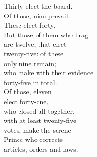\begin{paracol}{2}
	\begin{leftcolumn}
		\centering
		\textit{}
	\end{leftcolumn}
	
	\begin{rightcolumn}
		\centering
			Thirty elect the board. \\ 
			Of those, nine prevail. \\
			These elect forty.\\
			But those of them who brag \\
			are twelve, that elect \\
			twenty-five: of these \\
			only nine remain; \\
			who make with their evidence \\
			forty-five in total. \\
			Of those, eleven \\
			elect forty-one, \\
			who closed all together, \\
			with at least twenty-five \\
			votes, make the serene \\
			Prince who corrects \\
			articles, orders and laws. \\
	\end{rightcolumn}
\end{paracol}
\vspace{2em}

